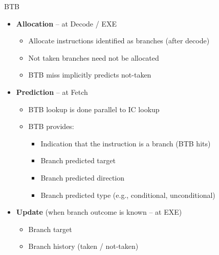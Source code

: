 \documentclass[aspectratio=169,12pt]{beamer}
\begin{document}
\begin{frame}{BTB}
    \begin{itemize}
        \item \textbf{Allocation} – at Decode / EXE
        \begin{itemize}
            \item Allocate instructions identified as branches (after decode)
            \item Not taken branches need not be allocated
            \item BTB miss implicitly predicts not-taken
        \end{itemize}
        \item \textbf{Prediction} – at Fetch
        \begin{itemize}
            \item BTB lookup is done parallel to IC lookup
            \item BTB provides:
            \begin{itemize}
                \item Indication that the instruction is a branch (BTB hits)
                \item Branch predicted target
                \item Branch predicted direction
                \item Branch predicted type (e.g., conditional, unconditional)
            \end{itemize}
        \end{itemize}
        \item \textbf{Update} (when branch outcome is known – at EXE)
        \begin{itemize}
            \item Branch target
            \item Branch history (taken / not-taken)
        \end{itemize}
    \end{itemize}
\end{frame}
\end{document}
